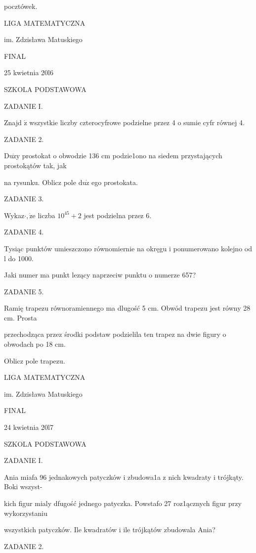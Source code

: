 \documentclass[a4paper,12pt]{article}
\begin{document}
pocztówek.






LIGA MATEMATYCZNA

im. Zdzisława Matuskiego

FINAL

25 kwietnia 20l6

SZKOLA PODSTAWOWA

ZADANIE I.

Znajd $\acute{\mathrm{z}}$ wszystkie liczby czterocyfrowe podzielne przez 4 o sumie cyfr równej 4.

ZADANIE 2.

$\mathrm{D}\mathrm{u}\dot{\mathrm{z}}\mathrm{y}$ prostokat o obwodzie 136 cm podzie1ono na siedem przystających prostokątów tak, jak

na rysunku. Oblicz pole $\mathrm{d}\mathrm{u}\dot{\mathrm{z}}$ ego prostokata.

ZADANIE 3.

Wykaz$\cdot, \dot{\mathrm{z}}\mathrm{e}$ liczba $10^{45}+2$ jest podzielna przez 6.

ZADANIE 4.

Tysiąc punktów umieszczono równomiernie na okręgu i ponumerowano kolejno od l do 1000.

Jaki numer ma punkt lezący naprzeciw punktu o numerze 657?

ZADANIE 5.

Ramię trapezu równoramiennego ma dlugość 5 cm. Obwód trapezu jest równy 28 cm. Prosta

przechodząca przez środki podstaw podzielila ten trapez na dwie figury o obwodach po 18 cm.

Oblicz pole trapezu.






LIGA MATEMATYCZNA

im. Zdzisława Matuskiego

FINAL

24 kwietnia 20l7

SZKOLA PODSTAWOWA

ZADANIE I.

Ania miafa 96 jednakowych patyczków i zbudowa1a z nich kwadraty i trójkąty. Boki wszyst-

kich figur mialy dfugość jednego patyczka. Powstafo 27 roz1ącznych figur przy wykorzystaniu

wszystkich patyczków. Ile kwadratów i ile trójkątów zbudowala Ania?

ZADANIE 2.
\end{document}
